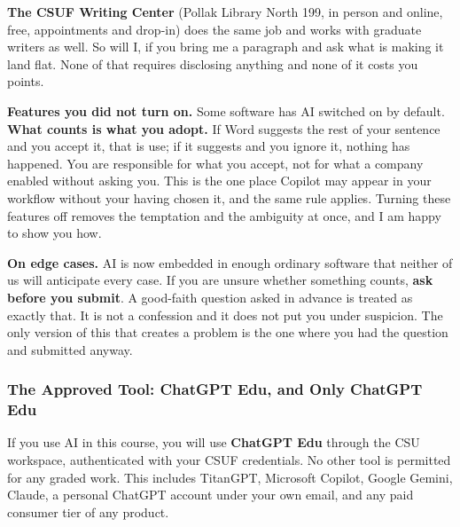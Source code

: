\documentclass[11pt]{article}     %
\begin{document}
\vspace{0.5em}
\noindent \textbf{The CSUF Writing Center} (Pollak Library North 199, in person and online, free, appointments and drop-in) does the same job and works with graduate writers as well. So will I, if you bring me a paragraph and ask what is making it land flat. None of that requires disclosing anything and none of it costs you points.

\vspace{0.5em}
\noindent \textbf{Features you did not turn on.} Some software has AI switched on by default. \textbf{What counts is what you adopt.} If Word suggests the rest of your sentence and you accept it, that is use; if it suggests and you ignore it, nothing has happened. You are responsible for what you accept, not for what a company enabled without asking you. This is the one place Copilot may appear in your workflow without your having chosen it, and the same rule applies. Turning these features off removes the temptation and the ambiguity at once, and I am happy to show you how.

\vspace{0.5em}
\noindent \textbf{On edge cases.} AI is now embedded in enough ordinary software that neither of us will anticipate every case. If you are unsure whether something counts, \textbf{ask before you submit}. A good-faith question asked in advance is treated as exactly that. It is not a confession and it does not put you under suspicion. The only version of this that creates a problem is the one where you had the question and submitted anyway.

\subsubsection*{The Approved Tool: ChatGPT Edu, and Only ChatGPT Edu}

If you use AI in this course, you will use \textbf{ChatGPT Edu} through the CSU workspace, authenticated with your CSUF credentials. No other tool is permitted for any graded work. This includes TitanGPT, Microsoft Copilot, Google Gemini, Claude, a personal ChatGPT account under your own email, and any paid consumer tier of any product.
\end{document}
